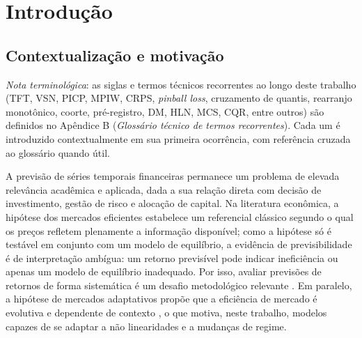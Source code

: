 \chapter{Introdução} \label{chap:intro}


\section{Contextualização e motivação}
\textit{Nota terminológica}: as siglas e termos técnicos recorrentes ao longo deste trabalho (TFT, VSN, PICP, MPIW, CRPS, \textit{pinball loss}, cruzamento de quantis, rearranjo monotônico, coorte, pré-registro, DM, HLN, MCS, CQR, entre outros) são definidos no Apêndice B (\textit{Glossário técnico de termos recorrentes}). Cada um é introduzido contextualmente em sua primeira ocorrência, com referência cruzada ao glossário quando útil.

A previsão de séries temporais financeiras permanece um problema de elevada relevância acadêmica e aplicada, dada a sua relação direta com decisão de investimento, gestão de risco e alocação de capital. Na literatura econômica, a hipótese dos mercados eficientes estabelece um referencial clássico segundo o qual os preços refletem plenamente a informação disponível; como a hipótese só é testável em conjunto com um modelo de equilíbrio, a evidência de previsibilidade é de interpretação ambígua: um retorno previsível pode indicar ineficiência ou apenas um modelo de equilíbrio inadequado. Por isso, avaliar previsões de retornos de forma sistemática é um desafio metodológico relevante \cite{FAMA1991}. Em paralelo, a hipótese de mercados adaptativos propõe que a eficiência de mercado é evolutiva e dependente de contexto \cite{LO2004}, o que motiva, neste trabalho, modelos capazes de se adaptar a não linearidades e a mudanças de regime.

